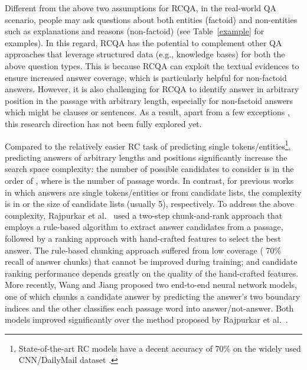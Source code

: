 \documentclass[letterpaper]{article}
\begin{document}
Different from the above two assumptions for RCQA, in the real-world QA scenario, people may ask questions about both entities (factoid) and non-entities such as explanations and reasons (non-factoid) (see Table~\ref{example} for examples). 
In this regard, RCQA has the potential to complement other QA approaches that leverage structured data (e.g., knowledge bases) for both the above question types. This is because RCQA can exploit the textual evidences to ensure increased answer coverage, which is particularly helpful for non-factoid answers.
However, it is also challenging for RCQA to identify answer in arbitrary position in the passage with arbitrary length, especially for non-factoid answers which might be clauses or sentences.
As a result, apart from a few exceptions \cite{rajpurkar2016squad,wang2016machine}, this research direction has not been fully explored yet. 

Compared to the relatively easier RC task of predicting single tokens/entities\footnote{State-of-the-art RC models have a decent accuracy of 70\% on the widely used CNN/DailyMail dataset \cite{hermann2015teaching}.}, 
predicting answers of arbitrary lengths and positions significantly increase the search space complexity:
the number of possible candidates to consider is in the order of , where  is the number of passage words. In contrast, for previous works in which answers are single tokens/entities or from candidate lists, the complexity is in  or the size of candidate lists  (usually 5), respectively.
To address the above complexity, Rajpurkar et al.~ used a two-step chunk-and-rank approach that employs a rule-based algorithm to extract answer candidates from a passage, followed by a ranking approach with hand-crafted features to select the best answer. The rule-based chunking approach suffered from low coverage ( 70\% recall of answer chunks) that cannot be improved during training; and candidate ranking performance depends greatly on the quality of the hand-crafted features. More recently, Wang and Jiang  proposed two end-to-end neural network models, one of which chunks a candidate answer by predicting the answer's two boundary indices and the other classifies each passage word into answer/not-answer. Both models improved significantly over the method proposed by Rajpurkar et al.~.
\end{document}
